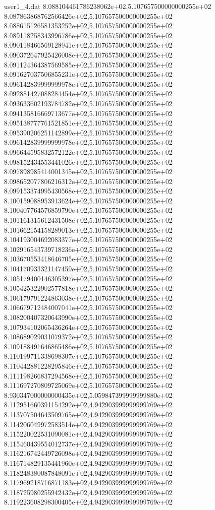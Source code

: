\begin{filecontents}{user1_4.dat}
8.088104461786238062e+02,5.107657500000000255e+02
8.087863868762566426e+02,5.107657500000000255e+02
8.088615126581353252e+02,5.107657500000000255e+02
8.089118258343996786e+02,5.107657500000000255e+02
8.090118466569128941e+02,5.107657500000000255e+02
8.090372647925426008e+02,5.107657500000000255e+02
8.091124364387569585e+02,5.107657500000000255e+02
8.091627037506855231e+02,5.107657500000000255e+02
8.096142839999999978e+02,5.107657500000000255e+02
8.092881427088284454e+02,5.107657500000000255e+02
8.093633602193784782e+02,5.107657500000000255e+02
8.094135816669713677e+02,5.107657500000000255e+02
8.095138777761521851e+02,5.107657500000000255e+02
8.095390206251142899e+02,5.107657500000000255e+02
8.096142839999999978e+02,5.107657500000000255e+02
8.096644595832572122e+02,5.107657500000000255e+02
8.098152434553441026e+02,5.107657500000000255e+02
8.097898985414001345e+02,5.107657500000000255e+02
8.098652077806216312e+02,5.107657500000000255e+02
8.099153374995430568e+02,5.107657500000000255e+02
8.100159088953913624e+02,5.107657500000000255e+02
8.100407764576859790e+02,5.107657500000000255e+02
8.101161315612431508e+02,5.107657500000000255e+02
8.101662154158289013e+02,5.107657500000000255e+02
8.104193004692083377e+02,5.107657500000000255e+02
8.102916543739718236e+02,5.107657500000000255e+02
8.103670553418646705e+02,5.107657500000000255e+02
8.104170933321147459e+02,5.107657500000000255e+02
8.105179400146305397e+02,5.107657500000000255e+02
8.105425322902577818e+02,5.107657500000000255e+02
8.106179791224863038e+02,5.107657500000000255e+02
8.106679712484007041e+02,5.107657500000000255e+02
8.108200407320643990e+02,5.107657500000000255e+02
8.107934102065436264e+02,5.107657500000000255e+02
8.108689029031079372e+02,5.107657500000000255e+02
8.109188491646865486e+02,5.107657500000000255e+02
8.110199711338698307e+02,5.107657500000000255e+02
8.110442881228295846e+02,5.107657500000000255e+02
8.111198266837294568e+02,5.107657500000000255e+02
8.111697270809725069e+02,5.107657500000000255e+02
8.930347000000000435e+02,5.059847399999999880e+02
8.112951660391154292e+02,4.942903999999999769e+02
8.113707504643509765e+02,4.942903999999999769e+02
8.114206049972583514e+02,4.942903999999999769e+02
8.115220022531090081e+02,4.942903999999999769e+02
8.115460439554012737e+02,4.942903999999999769e+02
8.116216742449726098e+02,4.942903999999999769e+02
8.116714829135441960e+02,4.942903999999999769e+02
8.118248380087848091e+02,4.942903999999999769e+02
8.117969218716871183e+02,4.942903999999999769e+02
8.118725980255942432e+02,4.942903999999999769e+02
8.119223608298300405e+02,4.942903999999999769e+02

\end{filecontents}

